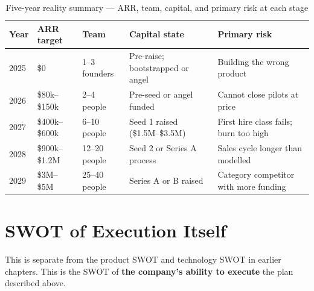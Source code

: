 \begin{table}[H]
\centering
\renewcommand{\arraystretch}{1.6}
\begin{tabularx}{\textwidth}{@{}lXXXX@{}}
\toprule
\textbf{Year} & \textbf{ARR target} & \textbf{Team} & \textbf{Capital state} & \textbf{Primary risk} \\
\midrule
2025 & \$0 & 1--3 founders & Pre-raise; bootstrapped or angel & Building the wrong product \\
2026 & \$80k--\$150k & 2--4 people & Pre-seed or angel funded & Cannot close pilots at price \\
2027 & \$400k--\$600k & 6--10 people & Seed 1 raised (\$1.5M--\$3.5M) & First hire class fails; burn too high \\
2028 & \$900k--\$1.2M & 12--20 people & Seed 2 or Series A process & Sales cycle longer than modelled \\
2029 & \$3M--\$5M & 25--40 people & Series A or B raised & Category competitor with more funding \\
\bottomrule
\end{tabularx}
\caption{Five-year reality summary — ARR, team, capital, and primary risk at each stage}
\end{table}

\section{SWOT of Execution Itself}

This is separate from the product SWOT and technology SWOT in earlier chapters.
This is the SWOT of \textbf{the company's ability to execute} the plan described
above.

